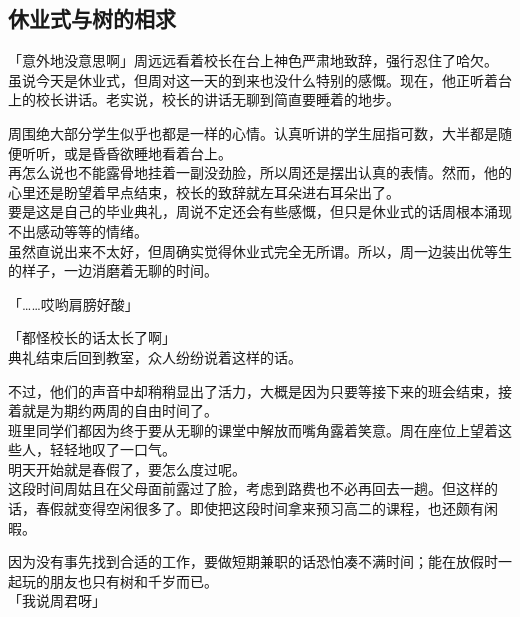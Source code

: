 \subsection{休业式与树的相求}

「意外地没意思啊」周远远看着校长在台上神色严肃地致辞，强行忍住了哈欠。\\

虽说今天是休业式，但周对这一天的到来也没什么特别的感慨。现在，他正听着台上的校长讲话。老实说，校长的讲话无聊到简直要睡着的地步。

周围绝大部分学生似乎也都是一样的心情。认真听讲的学生屈指可数，大半都是随便听听，或是昏昏欲睡地看着台上。\\

再怎么说也不能露骨地挂着一副没劲脸，所以周还是摆出认真的表情。然而，他的心里还是盼望着早点结束，校长的致辞就左耳朵进右耳朵出了。\\

要是这是自己的毕业典礼，周说不定还会有些感慨，但只是休业式的话周根本涌现不出感动等等的情绪。\\

虽然直说出来不太好，但周确实觉得休业式完全无所谓。所以，周一边装出优等生的样子，一边消磨着无聊的时间。\\

\vspace{2\baselineskip}

「……哎哟肩膀好酸」

「都怪校长的话太长了啊」\\

典礼结束后回到教室，众人纷纷说着这样的话。

不过，他们的声音中却稍稍显出了活力，大概是因为只要等接下来的班会结束，接着就是为期约两周的自由时间了。\\

班里同学们都因为终于要从无聊的课堂中解放而嘴角露着笑意。周在座位上望着这些人，轻轻地叹了一口气。\\

明天开始就是春假了，要怎么度过呢。\\

这段时间周姑且在父母面前露过了脸，考虑到路费也不必再回去一趟。但这样的话，春假就变得空闲很多了。即使把这段时间拿来预习高二的课程，也还颇有闲暇。

因为没有事先找到合适的工作，要做短期兼职的话恐怕凑不满时间；能在放假时一起玩的朋友也只有树和千岁而已。\\

「我说周君呀」\\

